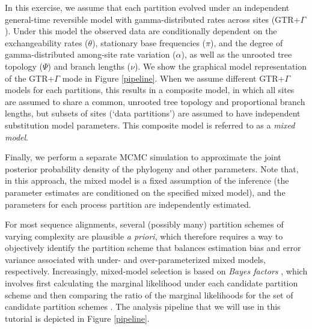 In this exercise, we assume that each partition evolved under an independent general-time reversible model with gamma-distributed rates across sites (GTR+$\Gamma$). 
Under this model the observed data are conditionally dependent on the exchangeability rates ($\theta$), stationary base frequencies ($\pi$), and the degree of gamma-distributed among-site rate variation ($\alpha$), as well as the unrooted tree topology ($\Psi$) and branch lengths ($\nu$).
We show the graphical model representation of the GTR+$\Gamma$ mode in Figure \ref{pipeline}. 
When we assume different GTR+$\Gamma$ models for each partitions, this results in a composite model, in which all sites are assumed to share a common, unrooted tree topology and proportional branch lengths, but subsets of sites (`data partitions') are assumed to have independent substitution model parameters.
This composite model is referred to as a \emph{mixed model}. 



Finally, we perform a separate MCMC simulation to approximate the joint posterior probability density of the phylogeny and other parameters.  Note that, in this approach, the mixed model is a fixed assumption of the inference (\IE the parameter estimates are conditioned on the specified mixed model), and the parameters for each process partition are independently estimated.

For most sequence alignments, several (possibly many) partition schemes of varying complexity are plausible {\it a priori}, which therefore requires a way to objectively identify the partition scheme that balances estimation bias and error variance associated with under- and over-parameterized mixed models, respectively.
Increasingly, mixed-model selection is based on \textit{Bayes factors} \citep[{\it e.g.},][]{Suchard2001}, which involves first calculating the marginal likelihood under each candidate partition scheme and then comparing the ratio of the marginal likelihoods for the set of candidate partition schemes \citep{Brandley2005,Nylander2004,Mcguire2007}.
The analysis pipeline that we will use in this tutorial is depicted in Figure \ref{pipeline}.

